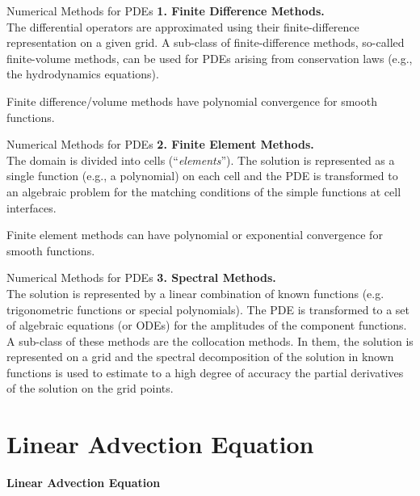 \documentclass[11pt]{beamer}
\begin{document}
\begin{frame}[fragile]{Numerical Methods for PDEs}
\textbf{1. Finite Difference Methods.}\\
      
      The differential operators are approximated using their finite-difference
      representation on a given grid. A sub-class of finite-difference methods,
      so-called finite-volume methods, can be used for PDEs arising from
      conservation laws (e.g., the hydrodynamics equations).

      Finite difference/volume methods have polynomial convergence for
      smooth functions.
\end{frame}

\begin{frame}[fragile]{Numerical Methods for PDEs}
 \textbf{2. Finite Element Methods.}\\
      The domain is divided into cells (``\emph{elements}''). The solution
      is represented as a single function (e.g., a polynomial) on each
      cell and the PDE is transformed to an algebraic problem for the matching
      conditions of the simple functions at cell interfaces.

      Finite element methods can have polynomial or exponential convergence
      for smooth functions.
\end{frame}

\begin{frame}[fragile]{Numerical Methods for PDEs}
 \textbf{3. Spectral Methods.}\\
      The solution is represented by a linear combination of known
      functions (e.g. trigonometric functions or special
      polynomials). The PDE is transformed to a set of algebraic
      equations (or ODEs) for the amplitudes of the component
      functions. A sub-class of these methods are the collocation
      methods. In them, the solution is represented on a grid and the
      spectral decomposition of the solution in known functions is
      used to estimate to a high degree of accuracy the partial
      derivatives of the solution on the grid points.
\end{frame}

\section{Linear Advection Equation}
\begin{frame}[fragile]{}
\textbf{Linear Advection Equation }
\end{frame}
\end{document}

